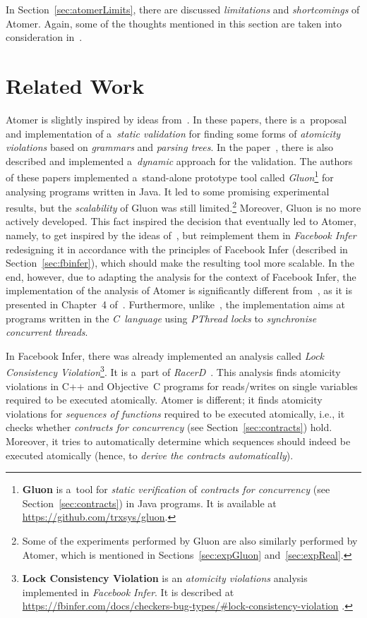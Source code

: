 In Section~\ref{sec:atomerLimits}, there are discussed \emph{limitations} and
\emph{shortcomings} of Atomer. Again, some of the thoughts mentioned in this
section are taken into consideration in~\cite{harmimBP, excel2021Harmim}.


\section{Related Work}
\label{sec:atomerRelatedWork}

Atomer is slightly inspired by ideas from~\cite{contracts2017, contracts2015}.
In these papers, there is a~proposal and implementation of a~\emph{static
validation} for finding some forms of \emph{atomicity violations} based on
\emph{grammars} and \emph{parsing trees}. In the paper~\cite{contracts2017},
there is also described and implemented a~\emph{dynamic} approach for the
validation. The authors of these papers implemented a~stand-alone prototype
tool called \emph{Gluon}\footnote{\textbf{Gluon} is a~tool for \emph{static
verification} of \emph{contracts for concurrency}
(see Section~\ref{sec:contracts}) in Java programs. It is available at
\url{https://github.com/trxsys/gluon}.} for analysing programs written in Java.
It led to some promising experimental results, but the \emph{scalability} of
Gluon was still limited.\footnote{Some of the experiments performed by Gluon
are also similarly performed by Atomer, which is mentioned in
Sections~\ref{sec:expGluon} and~\ref{sec:expReal}.} Moreover, Gluon is no more
actively developed. This fact inspired the decision that eventually led to
Atomer, namely, to get inspired by the ideas of~\cite{contracts2017,
contracts2015}, but reimplement them in \emph{Facebook Infer} redesigning it
in accordance with the principles of Facebook Infer (described in
Section~\ref{sec:fbinfer}), which should make the resulting tool more
scalable. In the end, however, due to adapting the analysis for the context
of Facebook Infer, the implementation of the analysis of Atomer is
significantly different from~\cite{contracts2017, contracts2015}, as it is
presented in Chapter~4 of~\cite{harmimBP}. Furthermore,
unlike~\cite{contracts2017, contracts2015}, the implementation aims at
programs written in the \emph{C~language} using \emph{PThread locks} to
\emph{synchronise concurrent threads}.

In Facebook Infer, there was already implemented an analysis called \emph{Lock
Consistency Violation}\footnote{\textbf{Lock Consistency Violation} is an
\emph{atomicity violations} analysis implemented in \emph{Facebook Infer}. It
is described at
\url{https://fbinfer.com/docs/checkers-bug-types/\#lock-consistency-violation}%
.}. It is a~part of \emph{RacerD}~\cite{racerD, staticRaceDetectorTruePositives,
racerDOnline}. This analysis finds atomicity violations in C++ and Objective~C
programs for reads/writes on single variables required to be executed
atomically. Atomer is different; it finds atomicity violations for
\emph{sequences of functions} required to be executed atomically, i.e., it
checks whether \emph{contracts for concurrency}
(see Section~\ref{sec:contracts}) hold. Moreover, it tries to automatically
determine which sequences should indeed be executed atomically (hence, to
\emph{derive the contracts automatically}).


